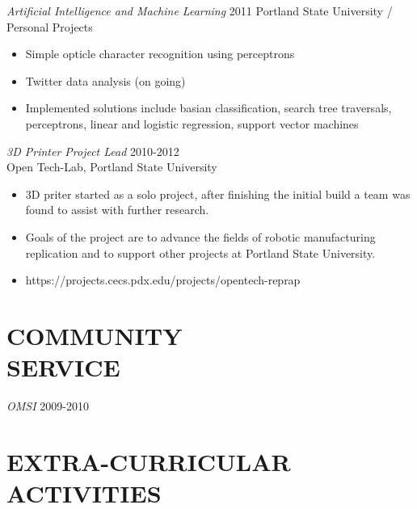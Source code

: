 \documentclass[margin]{res}
\begin{document}
\begin{resume}
				{\sl Artificial Intelligence and Machine Learning} \hfill 2011
				Portland State University / Personal Projects
				\begin{itemize} \itemsep -2pt
					\item	Simple opticle character recognition using perceptrons
					\item	Twitter data analysis (on going)
					\item 	Implemented solutions include basian classification, search tree traversals, perceptrons, linear and logistic regression,
							support vector machines %
				\end{itemize}
				
				{\sl 3D Printer Project Lead} \hfill 2010-2012 \\
                Open Tech-Lab, Portland State University
				\begin{itemize}  \itemsep -2pt %
					\item  	3D priter started as a solo project, after
					 		finishing the initial build a team was found to
							assist with further research.
					\item  	Goals of the project are to advance the fields of 
					 		robotic manufacturing replication and to support
							other projects at Portland State University.
					\item   https://projects.cecs.pdx.edu/projects/opentech-reprap
                \end{itemize}
 
					 
\section{COMMUNITY \\ SERVICE}  
				{\sl OMSI} \hfil 2009-2010



\section{EXTRA-CURRICULAR \\ ACTIVITIES}             
				 

\end{resume}
\end{document}
